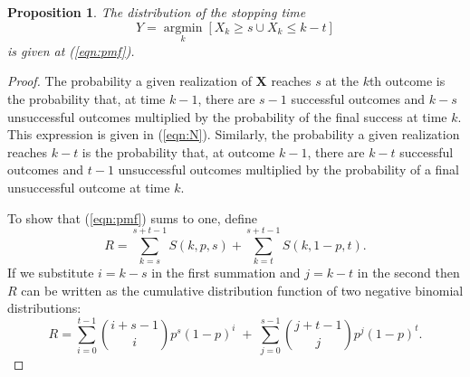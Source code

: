 \documentclass[review]{elsarticle}
\DeclareMathOperator*{\argmin}{argmin}
\newcommand*{\argminl}{\argmin\limits}
\newtheorem{prop}{Proposition}
\begin{document}
\begin{prop}
The distribution of the stopping time
\begin{equation*}
Y = \argminl_k \left[X_k \geq s \cup X_k \leq k-t \right]
\end{equation*}
is given at (\ref{eqn:pmf}).
\end{prop}
\begin{proof}

The probability a given realization of $\mathbf{X}$ reaches $s$ at
the $k$th outcome is the probability that, at time $k-1$, there are $s-1$
successful outcomes and $k-s$ unsuccessful outcomes multiplied by
the probability of the final success at time $k$. This expression is given
in (\ref{eqn:N}). 
Similarly, the probability a given realization reaches $k-t$
is the probability that, at outcome $k-1$, there are $k-t$ successful outcomes
and $t-1$ unsuccessful outcomes multiplied by the probability of a final
unsuccessful outcome at time $k$.  


To show that (\ref{eqn:pmf}) sums to one, define
\begin{equation*} 
R = \sum_{k=s}^{s+t-1} S(k, p, s) + \sum_{k=t}^{s+t-1} S(k, 1-p, t).
\end{equation*}
If we substitute $i=k-s$ in the first summation and $j=k-t$ in the second then
$R$ can be written as the cumulative distribution function of two
negative binomial distributions:
\begin{equation} \label{eqn:transformed_sum}
R = \sum_{i=0}^{t-1} {i+s-1 \choose i} p^s (1-p)^i \; + \;
\sum_{j=0}^{s-1} {j+t-1 \choose j} p^j (1-p)^t.
\end{equation}


\end{proof}
\end{document}
